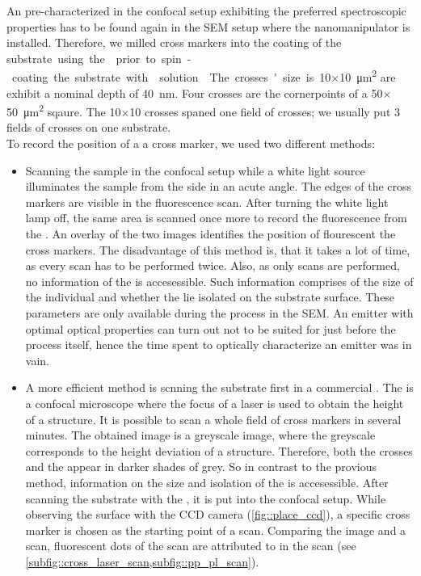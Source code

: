	An \nd pre-characterized in the confocal setup exhibiting the preferred spectroscopic properties has to be found again in the SEM setup where the nanomanipulator is installed.
	Therefore, we milled cross markers into the \ir coating of the \si substrate using the \fib prior to spin-coating the substrate with \nd solution.
	The crosses' size is \num{10}$\times$\SI{10}{\micro\meter\squared} are exhibit a nominal depth of \SI{40}{nm}.
	Four crosses are the cornerpoints of a \num{50}$\times$\SI{50}{\micro\meter\squared} sqaure.
	The \num{10}$\times$\num{10} crosses spaned one field of crosses; we usually put 3 fields of crosses on one substrate.
	\\
	To record the position of a \nd \wrt a cross marker, we used two different methods:
	\begin{itemize}
		\item Scanning the sample in the confocal setup while a white light source illuminates the sample from the side in an acute angle. The edges of the cross markers are visible in the fluorescence scan. After turning the white light lamp off, the same area is scanned once more to record the fluorescence from the \sivs. An overlay of the two images identifies the position of flourescent \sivs \wrt the cross markers. The disadvantage of this method is, that it takes a lot of time, as every scan has to be performed twice. Also, as only \fl scans are performed, no information of the \nds is accesessible. Such information comprises of the size of the individual \nds and whether the \nds lie isolated on the substrate surface. These parameters are only available during the \pp process in the SEM. An emitter with optimal optical properties can turn out not to be suited for \pp just before the process itself, hence the time spent to optically characterize an emitter was in vain.
		\item A more efficient method is scnning the substrate first in a commercial \lsm {}. The \lsm is a confocal microscope where the focus of a laser is used to obtain the height of a structure. It is possible to scan a whole field of cross markers in several minutes. The obtained image is a greyscale image, where the greyscale corresponds to the height deviation of a structure. Therefore, both the crosses and the \nds appear in darker shades of grey. So in contrast to the provious method, information on the size and isolation of the \nds is accesessible. After scanning the substrate with the \lsm, it is put into the confocal setup. While observing the surface with the CCD camera (\cref{fig::place_ccd}), a specific cross marker is chosen as the starting point of a \fl scan. Comparing the \lsm image and a \fl scan, fluorescent dots of the \fl scan are attributed to \nds in the \lsm scan (see \cref{subfig::cross_laser_scan,subfig::pp_pl_scan}).
	\end{itemize}

